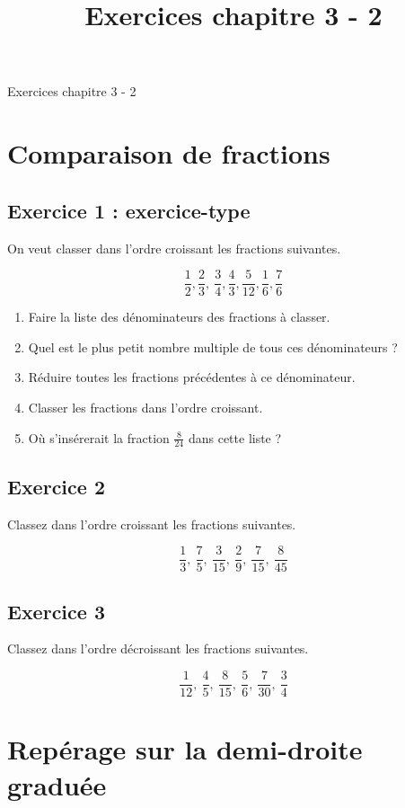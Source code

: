 \documentclass[14 pt]{extarticle}
\title{Exercices chapitre 3 - 2}
\date{}
\theoremstyle{plain}
\begin{document}
\begin{center}{\Large Exercices chapitre 3 - 2}\\ 
 \end{center}
 
 \section{Comparaison de fractions}
 
\subsection*{Exercice 1 : exercice-type}
On veut classer dans l'ordre croissant les fractions suivantes. 

\[ \frac12, \frac23, \ \frac34, \frac43, \frac 5{12}, \frac16, \frac76\]
\begin{enumerate}
\item Faire la liste des dénominateurs des fractions à classer. 
\item Quel est le plus petit nombre multiple de tous ces dénominateurs ? 
\item Réduire toutes les fractions précédentes à ce dénominateur. 
\item Classer les fractions dans l'ordre croissant. 
\item Où s'insérerait la fraction $\frac{8}{24}$ dans cette liste ?
\end{enumerate} 
 
 
 \subsection*{Exercice 2}
 
 Classez dans l'ordre croissant les fractions suivantes. 
 
 \[ \frac13,\ \frac7{5},\ \frac3{15},\ \frac29,\ \frac7{15},\ 
 \frac8{45}\]
 
 
 \subsection*{Exercice 3}
 
 Classez dans l'ordre décroissant les fractions suivantes. 
 
 \[ \frac1{12},\ \frac4{5},\ \frac8{15},\ \frac5{6},\ \frac7{30},\ 
 \frac3{4}\]
 
 \section{Repérage sur la demi-droite graduée}
\end{document}
